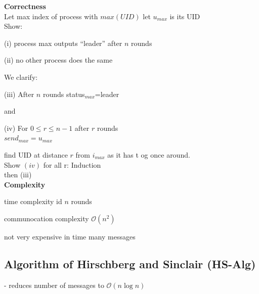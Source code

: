 \documentclass[ngerman,a4paper]{report}
\begin{document}
\textbf{Correctness}\\
Let max index of process with $max(UID)$ let $u_{max}$ is its UID\\
Show:\\
\begin{compactitem}
\item[(i)] process max outputs ``leader'' after $n$ rounds
\item[(ii)] no other process does the same
\end{compactitem}

We clarify:\\
\begin{compactitem}
\item[(iii)] After $n$ rounds status$_{max}$=leader
\end{compactitem}
and\\
\begin{compactitem}
\item[(iv)] For $0\leq r\leq n-1$ after $r$ rounds\\
	$send_{max}=u_{max}$
\end{compactitem}
find UID at distance $r$ from $i_{max}$ as it has t og once around.\\

Show $(iv)$ for all r: Induction\\
then (iii)\\

\textbf{Complexity}\\
\begin{compactitem}
\item time complexity id $n$ rounds
\item communocation complexity $\mathcal{O}(n^2)$
\item not very expensive in time many messages

\end{compactitem}

\subsection{Algorithm of Hirschberg and Sinclair (HS-Alg)}
- reduces number of messages to $\mathcal{O}(n \log n)$\\
\end{document}
